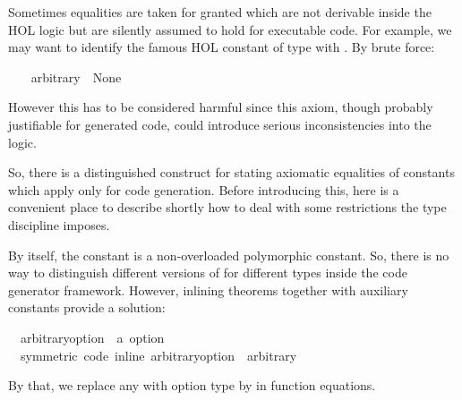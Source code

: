 \begin{isabellebody}
\begin{isamarkuptext}
  Sometimes equalities are taken for granted which are
  not derivable inside the HOL logic but are silently assumed
  to hold for executable code.  For example, we may want
  to identify the famous HOL constant 
  of type  with .
  By brute force:%
\end{isamarkuptext}%
\isamarkuptrue%
\isamarkupfalse%
\ \isanewline
\ \ {\isachardoublequoteopen}arbitrary\ {\isacharequal}\ None{\isachardoublequoteclose}%
\begin{isamarkuptext}%
However this has to be considered harmful since this axiom,
  though probably justifiable for generated code, could
  introduce serious inconsistencies into the logic.

  So, there is a distinguished construct for stating axiomatic
  equalities of constants which apply only for code generation.
  Before introducing this, here is a convenient place to describe
  shortly how to deal with some restrictions the type discipline
  imposes.

  By itself, the constant  is a non-overloaded
  polymorphic constant.  So, there is no way to distinguish
  different versions of  for different types
  inside the code generator framework.  However, inlining
  theorems together with auxiliary constants provide a solution:%
\end{isamarkuptext}%
\isamarkuptrue%
\isamarkupfalse%
\isanewline
\ \ arbitrary{\isacharunderscore}option\ {\isacharcolon}{\isacharcolon}\ {\isachardoublequoteopen}{\isacharprime}a\ option{\isachardoublequoteclose}\ \isanewline
\ \ {\isacharbrackleft}symmetric{\isacharcomma}\ code\ inline{\isacharbrackright}{\isacharcolon}\ {\isachardoublequoteopen}arbitrary{\isacharunderscore}option\ {\isacharequal}\ arbitrary{\isachardoublequoteclose}%
\begin{isamarkuptext}%
By that, we replace any  with option type
  by  in function equations.


\end{isamarkuptext}
\end{isabellebody}
